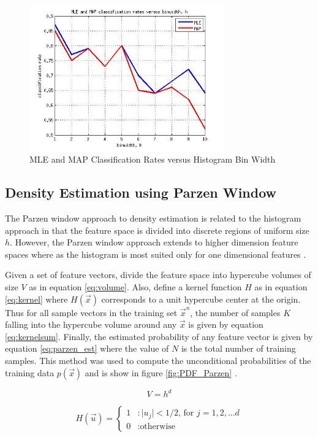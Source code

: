 \documentclass[journal]{IEEEtran}
\begin{document}
\begin{figure}[h]
\centering
\includegraphics[width=3.3in]{../images/ClassRate_Histogram.jpg}
\caption{MLE and MAP Classification Rates versus Histogram Bin Width}
\label{fig:ClassRate_Histogram}
\end{figure}

\subsection{Density Estimation using Parzen Window}
\par The Parzen window approach to density estimation is related to the histogram approach in that the feature space is divided into discrete regions of uniform size \(h\). However, the Parzen window approach extends to higher dimension feature spaces where as the histogram is most suited only for one dimensional features \cite[p.~164-167]{duda}.
\par Given a set of feature vectors, divide the feature space into hypercube volumes of size \(V\) as in equation \ref{eq:volume}. Also, define a kernel function \(H\) as in equation \ref{eq:kernel} where \(H(\vec{x})\) corresponds to a unit hypercube center at the origin. Thus for all sample vectors in the training set \(\vec{x}^n\), the number of samples \(K\) falling into the hypercube volume around any \(\vec{x}\) is given by equation \ref{eq:kernelsum}. Finally, the estimated probability of any feature vector is given by equation \ref{eq:parzen_est} where the value of \(N\) is the total number of training samples. This method was used to compute the unconditional probabilities of the training data \(p(\vec{x})\) and is show in figure \ref{fig:PDF_Parzen} \cite{densityhandout}.

\begin{equation}
\label{eq:volume}
V = h^d
\end{equation}

\begin{equation}
\label{eq:kernel}
H(\vec{u}) = \left\{
    \begin{array}{lr}
        1 & : \lvert{u_j}\rvert < 1/2\text{, for  } j=1,2,\ldots d \\
        0 & : \text{otherwise}
    \end{array}
    \right.
\end{equation}
\end{document}
